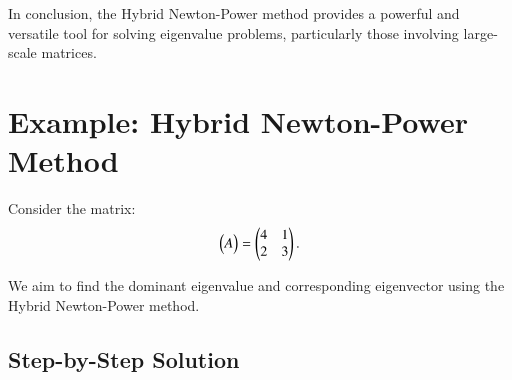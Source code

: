 \documentclass[journal,12pt,onecolumn]{IEEEtran}
\theoremstyle{remark}
\begin{document}
In conclusion, the Hybrid Newton-Power method provides a powerful and versatile tool for solving eigenvalue problems, particularly those involving large-scale matrices.
\section{Example: Hybrid Newton-Power Method}

Consider the matrix:
\begin{align}
\begin{pmatrix}A\end{pmatrix} = 
\begin{pmatrix}
4 & 1 \\
2 & 3
\end{pmatrix}.
\end{align}

We aim to find the dominant eigenvalue and corresponding eigenvector using the Hybrid Newton-Power method. 

\subsection*{Step-by-Step Solution}
\end{document}

